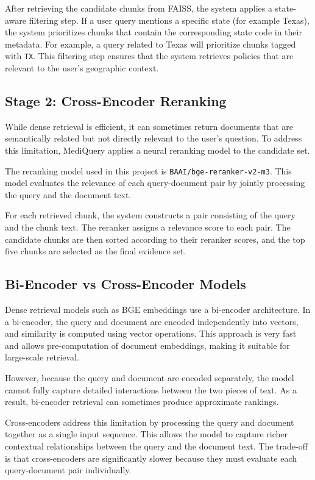 \documentclass[12pt, letterpaper]{article}
\begin{document}
After retrieving the candidate chunks from FAISS, the system applies a state-aware filtering step. If a user query mentions a specific state (for example Texas), the system prioritizes chunks that contain the corresponding state code in their metadata. For example, a query related to Texas will prioritize chunks tagged with \texttt{TX}. This filtering step ensures that the system retrieves policies that are relevant to the user's geographic context.

\subsection{Stage 2: Cross-Encoder Reranking}

While dense retrieval is efficient, it can sometimes return documents that are semantically related but not directly relevant to the user's question. To address this limitation, MediQuery applies a neural reranking model to the candidate set.

The reranking model used in this project is \texttt{BAAI/bge-reranker-v2-m3}. This model evaluates the relevance of each query-document pair by jointly processing the query and the document text.

For each retrieved chunk, the system constructs a pair consisting of the query and the chunk text. The reranker assigns a relevance score to each pair. The candidate chunks are then sorted according to their reranker scores, and the top five chunks are selected as the final evidence set.

\subsection{Bi-Encoder vs Cross-Encoder Models}

Dense retrieval models such as BGE embeddings use a bi-encoder architecture. In a bi-encoder, the query and document are encoded independently into vectors, and similarity is computed using vector operations. This approach is very fast and allows pre-computation of document embeddings, making it suitable for large-scale retrieval.

However, because the query and document are encoded separately, the model cannot fully capture detailed interactions between the two pieces of text. As a result, bi-encoder retrieval can sometimes produce approximate rankings.

Cross-encoders address this limitation by processing the query and document together as a single input sequence. This allows the model to capture richer contextual relationships between the query and the document text. The trade-off is that cross-encoders are significantly slower because they must evaluate each query-document pair individually.
\end{document}
